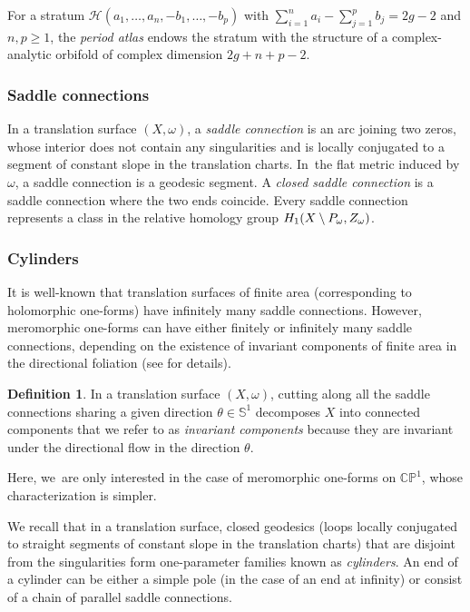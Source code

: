 \documentclass[JEP,XML,SOM,Unicode,NoFloatCountersInSection,published]{cedram}
\theoremstyle{definition}
\newtheorem{defn}[thm]{Definition}
\begin{document}
For a stratum $\mathcal{H}(a_{1},\dots,a_{n},-b_{1},\dots,-b_{p})$ with $\sum_{i=1}^n a_{i} - \sum_{j=1}^p b_{j} =2g-2$ and $n,p \geq 1$, the \textit{period atlas} endows the stratum with the structure of a complex-analytic orbifold of complex dimension $2g+n+p-2$.

\subsubsection{Saddle connections}

In a translation surface $(X,\omega)$, a \textit{saddle connection} is an arc joining two zeros, whose interior does not contain any singularities and is locally conjugated to a segment of constant slope in the translation charts. In~the flat metric induced by $\omega$, a saddle connection is a geodesic segment. A \textit{closed saddle connection} is a saddle connection where the two ends coincide.
Every saddle connection represents a class in the relative homology group $H_{1}(X \setminus\nobreak P_{\omega}, Z_{\omega})$.

\subsubsection{Cylinders}

It is well-known that translation surfaces of finite area (corresponding to holomorphic one-forms) have infinitely many saddle connections. However, meromorphic one-forms can have either finitely or infinitely many saddle connections, depending on the existence of invariant components of finite area in the directional foliation (see \cite[\S5]{tahar} for details).

\begin{defn}
In a translation surface $(X,\omega)$, cutting along all the saddle connections sharing a given direction $\theta \in \mathbb{S}^{1}$ decomposes $X$ into connected components that we refer to as \textit{invariant components} because they are invariant under the directional flow in the direction $\theta$.
\end{defn}

Here, we~are only interested in the case of meromorphic one-forms on $\mathbb{CP}^{1}$, whose characterization is simpler.

We recall that in a translation surface, closed geodesics (loops locally conjugated to straight segments of constant slope in the translation charts) that are disjoint from the singularities form one-parameter families known as \textit{cylinders}. An end of a cylinder can be either a simple pole (in the case of an end at infinity) or consist of a chain of parallel saddle connections.
\end{document}
